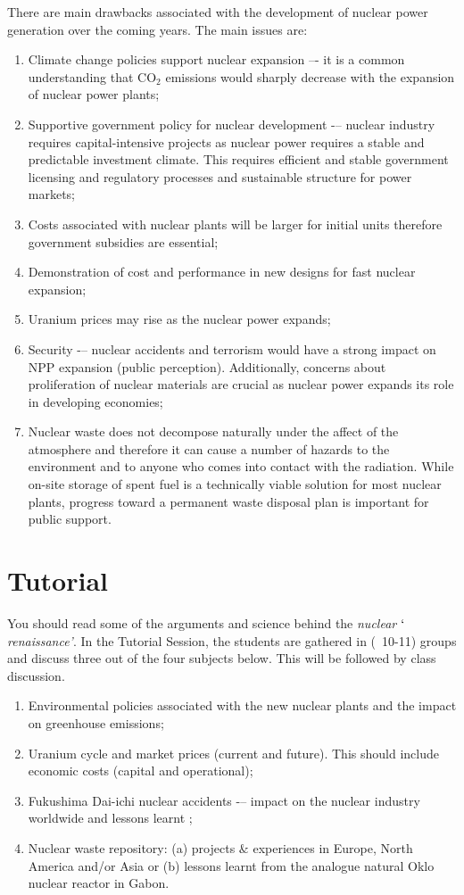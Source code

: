 \documentclass[14pt,twoside]{article}
\begin{document}
There are main drawbacks associated with the development of nuclear power generation over the coming years. The main issues are:
\begin{enumerate}
\item Climate change policies support nuclear expansion –- it is a common understanding that CO$_{2}$ emissions would sharply decrease with the expansion of nuclear power plants;
\item Supportive government policy for nuclear development -– nuclear industry requires capital-intensive projects as nuclear power requires a stable and predictable investment climate. This requires efficient and stable government licensing and regulatory processes and sustainable structure for power markets;
\item Costs associated with nuclear plants will be larger for initial units therefore government subsidies are essential;
\item Demonstration of cost and performance in new designs for fast nuclear expansion; 
\item Uranium prices may rise as the nuclear power expands;
\item Security -– nuclear accidents and terrorism would have a strong impact on NPP expansion (public perception). Additionally, concerns about proliferation of nuclear materials are crucial as nuclear power expands its role in developing economies;
\item Nuclear waste does not decompose naturally under the affect of the atmosphere and therefore it can cause a number of hazards to the environment and to anyone who comes into contact with the radiation. While on-site storage of spent fuel is a technically viable solution for most nuclear plants, progress toward a permanent waste disposal plan is important for public support.
\end{enumerate}

\section{Tutorial}
You should read some of the arguments and science behind the {\it nuclear $\lq$renaissance'}. In the Tutorial Session, the students are gathered in (~10-11) groups and discuss three out of the four subjects below. This will be followed by class discussion.
\begin{enumerate}
\item Environmental policies associated with the new nuclear plants and the impact on greenhouse emissions;
\item Uranium cycle and market prices (current and future). This should include economic costs (capital and operational);
\item Fukushima Dai-ichi nuclear accidents -– impact on the nuclear industry worldwide and lessons learnt \cite{iaea_2011};
\item Nuclear waste repository: (a) projects $\&$ experiences in Europe, North America and/or Asia or (b) lessons learnt from the analogue natural Oklo nuclear reactor \cite{meshik_2005} in Gabon.
\end{enumerate}
\end{document}
